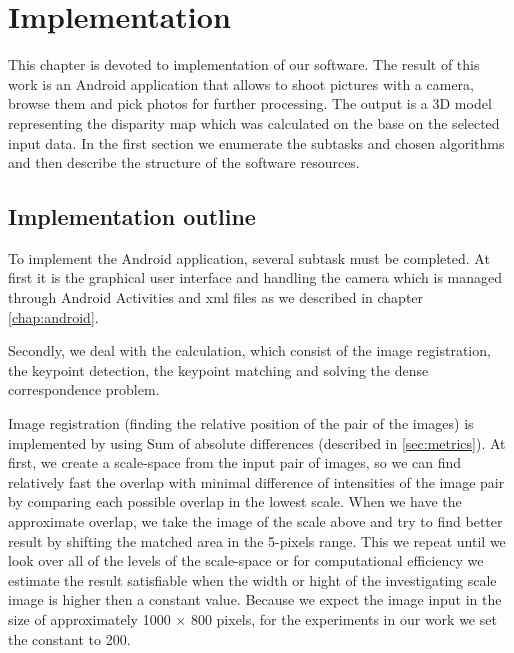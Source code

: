 \chapter{Implementation}
\label{chap:implementation}

This chapter is devoted to implementation of our software.
The result of this work is an Android application that allows to shoot pictures with a camera, browse them and pick photos for further processing.
The output is a 3D model representing the disparity map which was calculated on the base on the selected input data.
In the first section we enumerate the subtasks and chosen algorithms and then describe the structure of the software resources.
 
\section{Implementation outline}
To implement the Android application, several subtask must be completed.
At first it is the graphical user interface and handling the camera which is managed through Android Activities and xml files as we described in chapter \ref{chap:android}.

Secondly, we deal with the calculation, which consist of the image registration, the keypoint detection, the keypoint matching and solving the dense correspondence problem.

Image registration (finding the relative position of the pair of the images) is implemented by using Sum of absolute differences (described in \ref{sec:metrics}).
At first, we create a scale-space from the input pair of images, so we can find relatively fast the overlap with minimal difference of intensities of the image pair by comparing each possible overlap in the lowest scale. 
When we have the approximate overlap, we take the image of the scale above and try to find better result by shifting the matched area in the 5-pixels range.
This we repeat until we look over all of the levels of the scale-space or for computational efficiency we estimate the result satisfiable when the width or hight of the investigating scale image is higher then a constant value.
Because we expect the image input in the size of approximately 1000 $\times$ 800 pixels, for the experiments in our work we set the constant to 200. 

